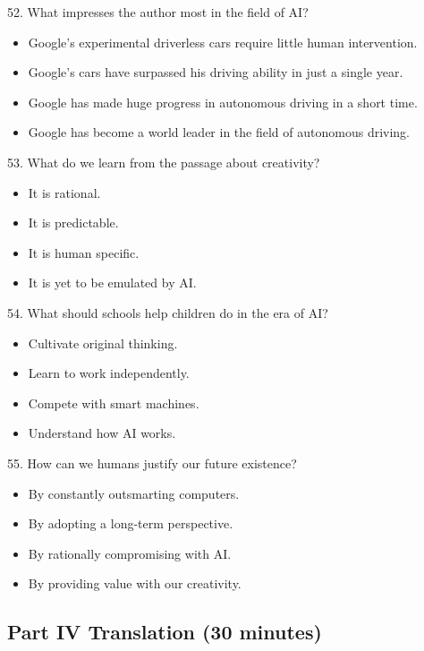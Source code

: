 \documentclass[UTF8,11pt]{ctexart}
\begin{document}
52. What impresses the author most in the field of AI?


\begin{itemize}[leftmargin=2em,itemsep=.2em,topsep=.4em]\item[A.] Google’s experimental driverless cars require little human intervention.
\item[B.] Google’s cars have surpassed his driving ability in just a single year.
\item[C.] Google has made huge progress in autonomous driving in a short time.
\item[D.] Google has become a world leader in the field of autonomous driving.
\end{itemize}

53. What do we learn from the passage about creativity?


\begin{itemize}[leftmargin=2em,itemsep=.2em,topsep=.4em]\item[A.] It is rational.
\item[B.] It is predictable.
\item[C.] It is human specific.
\item[D.] It is yet to be emulated by AI.
\end{itemize}

54. What should schools help children do in the era of AI?


\begin{itemize}[leftmargin=2em,itemsep=.2em,topsep=.4em]\item[A.] Cultivate original thinking.
\item[B.] Learn to work independently.
\item[C.] Compete with smart machines.
\item[D.] Understand how AI works.
\end{itemize}

55. How can we humans justify our future existence?


\begin{itemize}[leftmargin=2em,itemsep=.2em,topsep=.4em]\item[A.] By constantly outsmarting computers.
\item[B.] By adopting a long-term perspective.
\item[C.] By rationally compromising with AI.
\item[D.] By providing value with our creativity.
\end{itemize}

\subsection*{\textbf{Part} IV \textbf{Translation} \textbf{(30 minutes)}}
\end{document}
